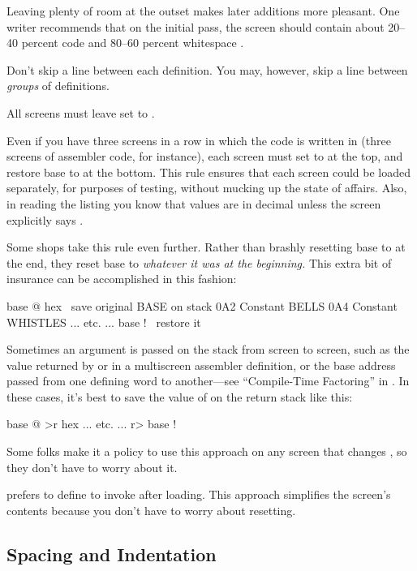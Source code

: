 Leaving plenty of room at the outset makes later additions more
pleasant.  One writer recommends that on the initial pass, the screen
should contain about 20--40 percent code and 80--60 percent
whitespace \cite{stevenson81}.

Don't skip a line between each definition.  You may, however, skip a
line between \emph{groups} of definitions.%
\begin{tip}
All screens must leave  set to .
\end{tip}
Even if you have three screens in a row in which the code is written
in  (three screens of assembler code, for instance), each
screen must set  to  at the top, and restore
base to  at the bottom.  This rule ensures that each
screen could be loaded separately, for purposes of testing, without
mucking up the state of affairs.  Also, in reading the listing you
know that values are in decimal unless the screen explicitly
says .

Some shops take this rule even further.  Rather than brashly resetting
base to  at the end, they reset base to \emph{whatever
it was at the beginning.} This extra bit of insurance can be
accomplished in this fashion:
\begin{Code}
base @       hex    \ save original BASE on stack
0A2 Constant BELLS
0A4 Constant WHISTLES
... etc. ...
base !              \ restore it
\end{Code}
\noindent Sometimes an argument is passed on the stack from screen to
screen, such as the value returned by  or  in a
multiscreen assembler definition, or the base address passed from one
defining word to another---see ``Compile-Time Factoring'' in .
In these cases, it's best to save the value of  on the
return stack like this:
\begin{Code}
base @ >r     hex
... etc. ...
r> base !
\end{Code}
Some folks make it a policy to use this approach on any screen that
changes , so they don't have to worry about it.%

 prefers to define 
to invoke  after loading.  This approach simplifies the
screen's contents because you don't have to worry about resetting.%

\subsection{Spacing and Indentation}%

